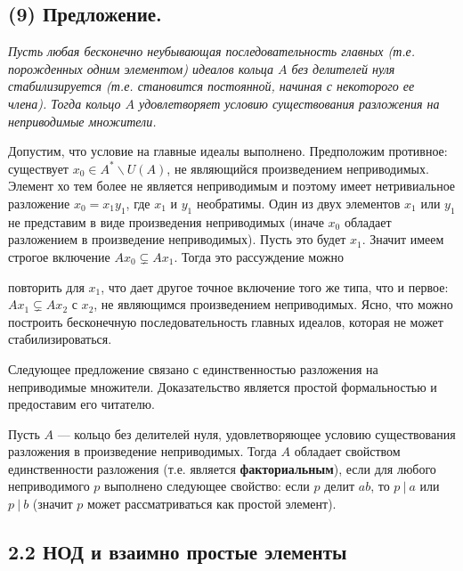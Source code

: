\documentclass{../../template/mai_book}
\begin{document}
\subsection{(9) Предложение.}
\textit{\indent Пусть любая бесконечно неубывающая последовательность главных (т.е. порожденных одним элементом) идеалов кольца $A$ без делителей нуля стабилизируется (т.е. становится постоянной, начиная с некоторого ее члена). Тогда кольцо $A$ удовлетворяет условию существования разложения на неприводимые множители.}

\begin{myproof}
Допустим, что условие на главные идеалы выполнено. Предположим противное: существует $x_0 \in A^* \backslash U(A)$, не являющийся произведением неприводимых. Элемент хо тем более не является неприводимым и поэтому имеет нетривиальное разложение $x_0 = x_1 y_1$, где $x_1$ и $y_1$ необратимы. Один из двух элементов $x_1$ или $y_1$ не представим в виде произведения неприводимых (иначе $x_0$ обладает разложением в произведение неприводимых). Пусть это будет $x_1$. Значит имеем строгое включение $A x_0 \varsubsetneq A x_1$. Тогда это рассуждение можно

\newpage
\noindent повторить для $x_1$, что дает другое точное включение того же типа, что и первое: $A x_1 \varsubsetneq A x_2$ с $x_2$, не являющимся произведением неприводимых. Ясно, что можно построить бесконечную последовательность главных идеалов, которая не может стабилизироваться.
\end{myproof}

Следующее предложение связано с единственностью разложения на неприводимые множители. Доказательство является простой формальностью и предоставим его читателю.

\begin{predl}
\textit{\indent} Пусть $A$ — кольцо без делителей нуля, удовлетворяющее условию существования разложения в произведение неприводимых. Тогда $A$ обладает свойством единственности разложения (т.е. является \textbf{факториальным}), если для любого неприводимого $p$ выполнено следующее свойство: если $p$ делит $ab$, то $p\:|\:a$ или $p\:|\:b$ (значит $p$ может рассматриваться как простой элемент).
\end{predl}

\subsection{\large 2.2 НОД и взаимно простые элементы}
\end{document}
